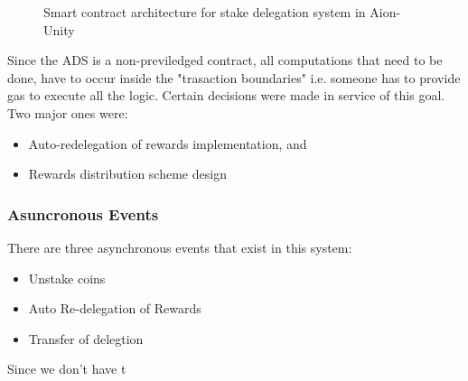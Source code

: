 \begin{figure}[ht]
\centering
{}
\caption{Smart contract architecture for stake delegation system in Aion-Unity}
\label{fig:contract_arch}
\end{figure}

Since the ADS is a non-previledged contract, all computations that need to be done, have to occur inside the "trasaction boundaries" i.e. someone has to provide gas to execute all the logic. Certain decisions were made in service of this goal. Two major ones were: 
\begin{itemize}[label=--,nosep]
    \item Auto-redelegation of rewards implementation, and 
    \item Rewards distribution scheme design
\end{itemize}

\subsubsection{Asuncronous Events}
There are three asynchronous events that exist in this system: 
\begin{itemize}
    \item Unstake coins
    \item Auto Re-delegation of Rewards
    \item Transfer of delegtion
\end{itemize}
Since we don't have t


